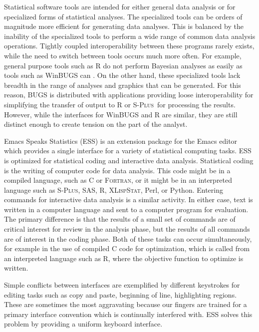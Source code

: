 \documentclass{article}
\newcommand*{\Splus}{\textsc{S-Plus}}
\newcommand*{\XLispStat}{\textsc{XLispStat}}
\newcommand*{\Fortran}{\textsc{Fortran}}
\begin{document}
Statistical software tools are intended for either general data
analysis or for specialized forms of statistical analyses.  The
specialized tools can be orders of magnitude more efficient for
generating data analyses.  This is balanced by the inability of the
specialized tools to perform a wide range of common data analysis
operations.  Tightly coupled interoperability between these programs
rarely exists, while the need to switch between tools occurs much more
often.  For example, general purpose tools such as R
\citep{ihak:gent:1996} do not perform Bayesian analyses as easily as
tools such as WinBUGS can \citep{SpieThomBest:1999}.  On the other
hand, these specialized tools lack breadth in the range of analyses
and graphics that can be generated.  For this reason, BUGS is
distributed with applications providing loose interoperability for
simplifying the transfer of output to R or \Splus\ for processing the
results.  However, while the interfaces for WinBUGS and R are similar,
they are still distinct enough to create tension on the part of the
analyst.

Emacs Speaks Statistics (ESS) \citep{ESS} is an extension package for
the Emacs editor which provides a single interface for a variety of
statistical computing tasks.  ESS is optimized for statistical coding
and interactive data analysis.  Statistical coding is the writing of
computer code for data analysis.  This code might be in a compiled
language, such as C or \Fortran, or it might be in an interpreted
language such as \Splus, SAS, R, \XLispStat, Perl, or Python.
Entering commands for interactive data analysis is a similar activity.
In either case, text is written in a computer language and sent to a
computer program for evaluation.  The primary difference is that the
results of a small set of commands are of critical interest for review
in the analysis phase, but the results of all commands are of interest
in the coding phase.  Both of these tasks can occur simultaneously,
for example in the use of compiled C code for optimization, which is
called from an interpreted language such as R, where the objective
function to optimize is written.

Simple conflicts between interfaces are exemplified by different
keystrokes for editing tasks such as copy and paste, beginning of
line, highlighting regions.  These are sometimes the most aggravating
because our fingers are trained for a primary interface convention
which is continually interfered with.  ESS solves this problem by
providing a uniform keyboard interface.
\end{document}
